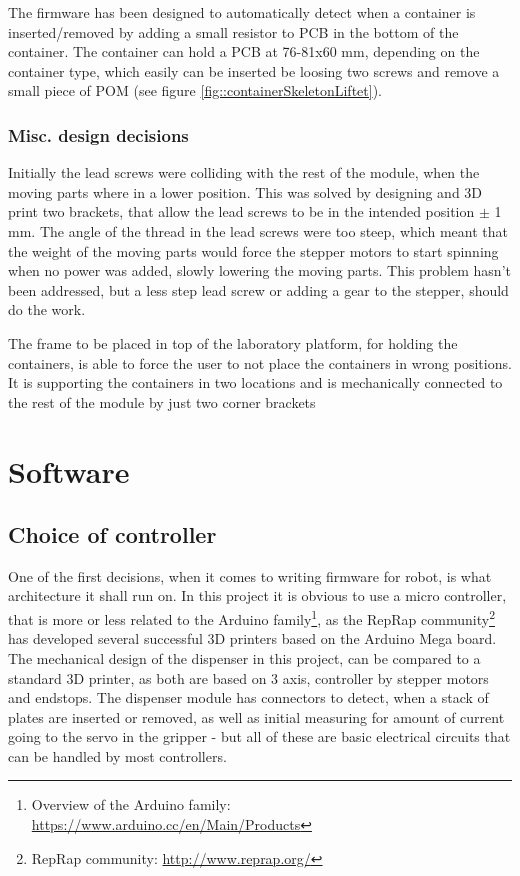 \documentclass[10pt,a4paper]{article}
\begin{document}
		The firmware has been designed to automatically detect when a container is inserted/removed by adding a small resistor to PCB in the bottom of the container. The container can hold a PCB at 76-81x60 mm, depending on the container type, which easily can be inserted be loosing two screws and remove a small piece of POM (see figure \ref{fig::containerSkeletonLiftet}).
		
		\subsubsection{Misc. design decisions}
		
		Initially the lead screws were  colliding with the rest of the module, when the moving parts where in a lower position. This was solved by designing and 3D print two brackets, that allow the lead screws to be in the intended position $\pm$ 1 mm. The angle of the thread in the lead screws were too steep, which meant that the weight of the moving parts would force the stepper motors to start spinning when no power was added, slowly lowering the moving parts. This problem hasn't been addressed, but a less step lead screw or adding a gear to the stepper, should do the work.
			
		The frame to be placed in top of the laboratory platform, for holding the containers, is able to force the user to not place the containers in wrong positions. It is supporting the containers in two locations and is mechanically connected to the rest of the module by just two corner brackets
			
	\section{Software}
		\subsection{Choice of controller}
		One of the first decisions, when it comes to writing firmware for robot, is what architecture it shall run on. In this project it is obvious to use a micro controller, that is more or less related to the Arduino family\footnote{Overview of the Arduino family: \url{https://www.arduino.cc/en/Main/Products}}, as the RepRap community\footnote{RepRap community: \url{http://www.reprap.org/}} has developed several successful 3D printers based on the Arduino Mega board. The mechanical design of the dispenser in this project, can be compared to a standard 3D printer, as both are based on 3 axis, controller by stepper motors and endstops. The dispenser module has connectors to detect, when a stack of plates are inserted or removed, as well as initial measuring for amount of current going to the servo in the gripper - but all of these are basic electrical circuits that can be handled by most controllers.
		
\end{document}
